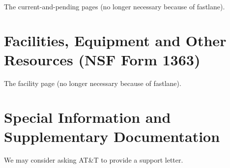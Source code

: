\documentclass[11pt]{article}
\begin{document}
The current-and-pending pages (no longer necessary because of fastlane). 

\section{Facilities, Equipment and Other Resources (NSF Form 1363)}

The facility page (no longer necessary because of fastlane).

\section{Special Information and Supplementary Documentation}

We may consider asking AT\&{}T to provide a support letter.
\end{document}
